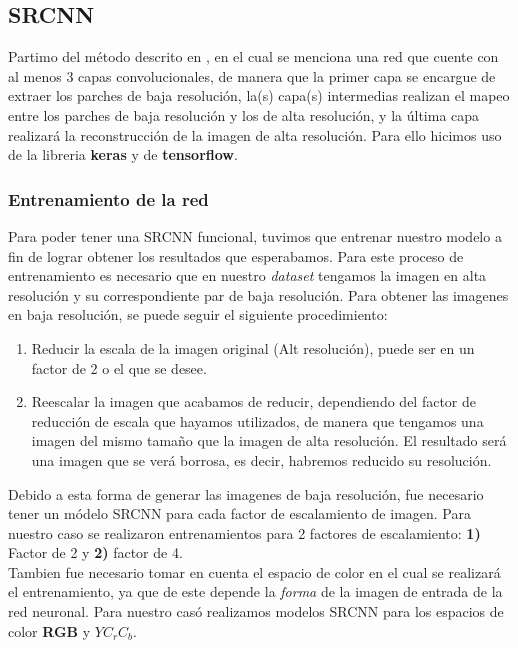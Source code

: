 \subsection{SRCNN}
Partimo del método descrito en \cite{SRCNN}, en el cual se menciona una red que cuente con al menos 3 capas convolucionales, de
manera que la primer capa se encargue de extraer los parches de baja resolución, la(s) capa(s) intermedias realizan el mapeo entre
los parches de baja resolución y los de alta resolución, y la última capa realizará la reconstrucción de la imagen de alta
resolución. Para ello hicimos uso de la libreria \textbf{keras} y de \textbf{tensorflow}.\\
\subsubsection{Entrenamiento de la red}
Para poder tener una SRCNN funcional, tuvimos que entrenar nuestro modelo a fin de lograr obtener los resultados que esperabamos.
Para este proceso de entrenamiento es necesario que en nuestro \emph{dataset} tengamos la imagen en alta resolución y su
correspondiente par de baja resolución. Para obtener las imagenes en baja resolución, se puede seguir el siguiente procedimiento:
\begin{enumerate}
    \item Reducir la escala de la imagen original (Alt resolución), puede ser en un factor de 2 o el que se desee.
    \item Reescalar la imagen que acabamos de reducir, dependiendo del factor de reducción de escala que hayamos utilizados, de
    manera que tengamos una imagen del mismo tamaño que la imagen de alta resolución. El resultado será una imagen que se verá
    borrosa, es decir, habremos reducido su resolución.
\end{enumerate}
Debido a esta forma de generar las imagenes de baja resolución, fue necesario tener un módelo SRCNN para cada factor de escalamiento
de imagen. Para nuestro caso se realizaron entrenamientos para 2 factores de escalamiento: \textbf{1)} Factor de 2 y \textbf{2)}
factor de 4.\\
Tambien fue necesario tomar en cuenta el espacio de color en el cual se realizará el entrenamiento, ya que de este depende la
\emph{forma} de la imagen de entrada de la red neuronal. Para nuestro casó realizamos modelos SRCNN para los espacios de color
\textbf{RGB} y \textbf{$YC_rC_b$}.\\

